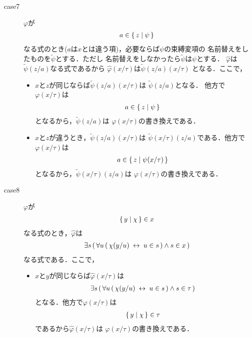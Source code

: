 \begin{metaprf}
\begin{description}
\begin{description}
					\item[case7] $\varphi$が
						\begin{align}
							a \in \{\, z \mid \psi\, \}
						\end{align}
						なる式のとき($a$は$x$とは違う項)，必要ならば$\psi$の束縛変項の
						名前替えをしたものを$\widetilde{\psi}$とする．ただし
						名前替えをしなかったら$\widetilde{\psi}$は$\psi$とする．
						$\widehat{\varphi}$は$\widetilde{\psi}(z/a)$なる式であるから
						$\widehat{\varphi}(x/\tau)$は$\widetilde{\psi}(z/a)(x/\tau)$
						となる．ここで，
						\begin{itemize}
							\item $x$と$z$が同じならば$\widetilde{\psi}(z/a)(x/\tau)$は
								$\widetilde{\psi}(z/a)$となる．
								他方で$\varphi(x/\tau)$は
								\begin{align}
									a \in \{\, z \mid \psi\, \}
								\end{align}
								となるから，$\widetilde{\psi}(z/a)$は
								$\varphi(x/\tau)$の書き換えである．
								
							\item $x$と$z$が違うとき，$\tilde{\psi}(z/a)(x/\tau)$は
								$\widetilde{\psi}(x/\tau)(z/a)$である．他方で
								$\varphi(x/\tau)$は
								\begin{align}
									a \in \{\, z \mid \psi(x/\tau)\, \}
								\end{align}
								となるから，$\widetilde{\psi}(x/\tau)(z/a)$は
								$\varphi(x/\tau)$の書き換えである．
						\end{itemize}
					
					\item[case8] $\varphi$が
						\begin{align}
							\{\, y \mid \chi\, \} \in x
						\end{align}
						なる式のとき，$\widehat{\varphi}$は
						\begin{align}
							\exists s\, (\, \forall u\, (\, \chi(y/u) \hspace{0.25em}\leftrightarrow\hspace{0.25em} u \in s\, ) \wedge s \in x\, )
						\end{align}
						なる式である．ここで，
						\begin{itemize}
							\item $x$と$y$が同じならば$\widehat{\varphi}(x/\tau)$は
								\begin{align}
									\exists s\, (\, \forall u\, (\, \chi(y/u) \hspace{0.25em}\leftrightarrow\hspace{0.25em} u \in s\, ) \wedge s \in \tau\, )
								\end{align}
								となる．他方で$\varphi(x/\tau)$は
								\begin{align}
									\{\, y \mid \chi\, \} \in \tau
								\end{align}
								であるから$\widehat{\varphi}(x/\tau)$は
								$\varphi(x/\tau)$の書き換えである．
								

\end{itemize}
\end{description}
\end{description}
\end{metaprf}
